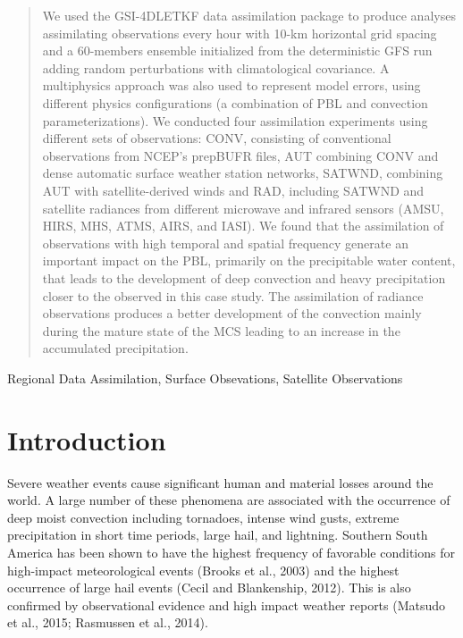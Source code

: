 \documentclass[final,5p,times,twocolumn,authoryear]{elsarticle} %
\begin{document}
\begin{frontmatter}
\begin{abstract}
  We used the GSI-4DLETKF data assimilation package to produce analyses assimilating observations every hour with 10-km horizontal grid spacing and a 60-members ensemble initialized from the deterministic GFS run adding random perturbations with climatological covariance. A multiphysics approach was also used to represent model errors, using different physics configurations (a combination of PBL and convection parameterizations). We conducted four assimilation experiments using different sets of observations: CONV, consisting of conventional observations from NCEP's prepBUFR files, AUT combining CONV and dense automatic surface weather station networks, SATWND, combining AUT with satellite-derived winds and RAD, including SATWND and satellite radiances from different microwave and infrared sensors (AMSU, HIRS, MHS, ATMS, AIRS, and IASI). We found that the assimilation of observations with high temporal and spatial frequency generate an important impact on the PBL, primarily on the precipitable water content, that leads to the development of deep convection and heavy precipitation closer to the observed in this case study. The assimilation of radiance observations produces a better development of the convection mainly during the mature state of the MCS leading to an increase in the accumulated precipitation.
  \end{abstract}
   \begin{keyword} Regional Data Assimilation, Surface Obsevations, Satellite Observations\end{keyword}
 \end{frontmatter}

\hypertarget{introduction}{%
\section{Introduction}\label{introduction}}

Severe weather events cause significant human and material losses around the world. A large number of these phenomena are associated with the occurrence of deep moist convection including tornadoes, intense wind gusts, extreme precipitation in short time periods, large hail, and lightning.
Southern South America has been shown to have the highest frequency of favorable conditions for high-impact meteorological events (Brooks et al., 2003) and the highest occurrence of large hail events (Cecil and Blankenship, 2012).
This is also confirmed by observational evidence and high impact weather reports (Matsudo et al., 2015; Rasmussen et al., 2014).
\end{document}
